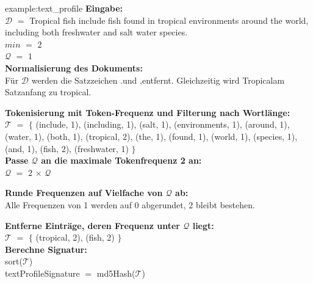 \begin{example}{example:text_profile}
	\textbf{Eingabe:}\\
		$\mathcal{D}$ $=$ \glqq Tropical fish include fish found in tropical environments around the world,
			including both freshwater and salt water species.\grqq\\
		$min$ $=$ $2$\\
		$\mathcal{Q}$ $=$ $1$\\

	\textbf{Normalisierung des Dokuments:}\\
		Für $\mathcal{D}$ werden die Satzzeichen \glqq .\grqq und \glqq ,\grqq entfernt.
		Gleichzeitig wird \glqq Tropical\grqq am Satzanfang zu \glqq tropical\grqq .

	\textbf{Tokenisierung mit Token-Frequenz und Filterung nach Wortlänge:}\\
		$\mathcal{T}$ $=$ $\{$ (include, 1), (including, 1), (salt, 1), (environments, 1), (around, 1), (water, 1),
			(both, 1), (tropical, 2), (the, 1), (found, 1), (world, 1), (species, 1), (and, 1), (fish, 2), (freshwater, 1) $\}$\\

	\textbf{Passe $\mathcal{Q}$ an die maximale Tokenfrequenz 2 an:}\\
		$\mathcal{Q}$ $=$ $2$ $\times$ $\mathcal{Q}$

	\textbf{Runde Frequenzen auf Vielfache von $\mathcal{Q}$ ab:}\\
		Alle Frequenzen von 1 werden auf 0 abgerundet, 2 bleibt bestehen.

	\textbf{Entferne Einträge, deren Frequenz unter $\mathcal{Q}$ liegt:}\\
		$\mathcal{T}$ $=$ $\{$ (tropical, 2), (fish, 2) $\}$\\
	
	\textbf{Berechne Signatur:}\\
		sort($\mathcal{T}$)\\
		textProfileSignature $=$ md5Hash($\mathcal{T}$)
\end{example}
